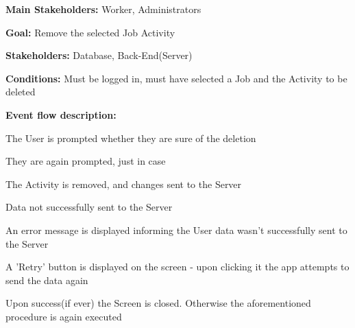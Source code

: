 			\noindent {}
			\begin{packed_item}
				\item \textbf{Main Stakeholders:} Worker, Administrators
				\item \textbf{Goal:} Remove the selected Job Activity
				\item \textbf{Stakeholders: } Database, Back-End(Server)
				\item \textbf{Conditions: } Must be logged in, must have selected a Job and the Activity to be deleted
				\item \textbf{Event flow description: }
				\begin{packed_enum}
					\item The User is prompted whether they are sure of the deletion
					\item They are again prompted, just in case
					\item The Activity is removed, and changes sent to the Server
				\end{packed_enum}
				
				\begin{packed_item}
					\item[3.a] Data not successfully sent to the Server
					\item[] \begin{packed_enum}
						\item An error message is displayed informing the User data wasn't successfully sent to the Server
						\item A 'Retry' button is displayed on the screen - upon clicking it the app attempts to send the data again
						\item Upon success(if ever) the Screen is closed. Otherwise the aforementioned procedure is again executed
					\end{packed_enum}
				\end{packed_item}
			\end{packed_item}
			
